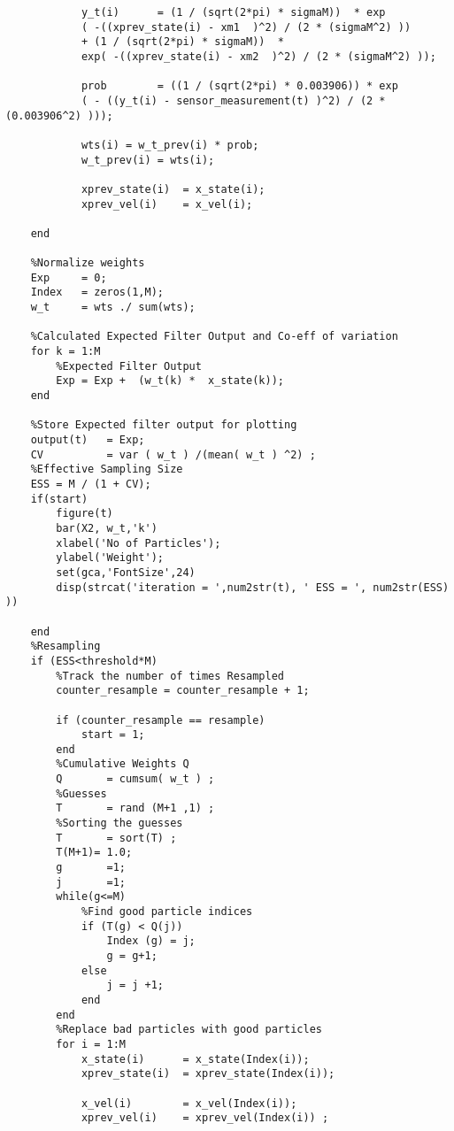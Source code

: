 \documentclass[12pt]{article}
\begin{document}
\begin{verbatim}
            y_t(i)      = (1 / (sqrt(2*pi) * sigmaM))  * exp
            ( -((xprev_state(i) - xm1  )^2) / (2 * (sigmaM^2) )) 
            + (1 / (sqrt(2*pi) * sigmaM))  * 
            exp( -((xprev_state(i) - xm2  )^2) / (2 * (sigmaM^2) ));
            
            prob        = ((1 / (sqrt(2*pi) * 0.003906)) * exp 
            ( - ((y_t(i) - sensor_measurement(t) )^2) / (2 * (0.003906^2) )));
            
            wts(i) = w_t_prev(i) * prob;
            w_t_prev(i) = wts(i);

            xprev_state(i)  = x_state(i);
            xprev_vel(i)    = x_vel(i);
            
    end
    
    %Normalize weights
    Exp     = 0;
    Index   = zeros(1,M);
    w_t     = wts ./ sum(wts);
     
    %Calculated Expected Filter Output and Co-eff of variation
    for k = 1:M
        %Expected Filter Output
        Exp = Exp +  (w_t(k) *  x_state(k));
    end
    
    %Store Expected filter output for plotting
    output(t)   = Exp;
    CV          = var ( w_t ) /(mean( w_t ) ^2) ;
    %Effective Sampling Size
    ESS = M / (1 + CV);
    if(start)
        figure(t)
        bar(X2, w_t,'k')
        xlabel('No of Particles');
        ylabel('Weight');
        set(gca,'FontSize',24)
        disp(strcat('iteration = ',num2str(t), ' ESS = ', num2str(ESS) ))
        
    end
    %Resampling
    if (ESS<threshold*M)
        %Track the number of times Resampled
        counter_resample = counter_resample + 1;
        
        if (counter_resample == resample)
            start = 1;
        end
        %Cumulative Weights Q
        Q       = cumsum( w_t ) ;
        %Guesses
        T       = rand (M+1 ,1) ;
        %Sorting the guesses
        T       = sort(T) ;
        T(M+1)= 1.0;
        g       =1; 
        j       =1;
        while(g<=M)
            %Find good particle indices
            if (T(g) < Q(j))
                Index (g) = j;
                g = g+1;
            else
                j = j +1;
            end
        end
        %Replace bad particles with good particles
        for i = 1:M
            x_state(i)      = x_state(Index(i));
            xprev_state(i)  = xprev_state(Index(i));

            x_vel(i)        = x_vel(Index(i));
            xprev_vel(i)    = xprev_vel(Index(i)) ;


\end{verbatim}
\end{document}
